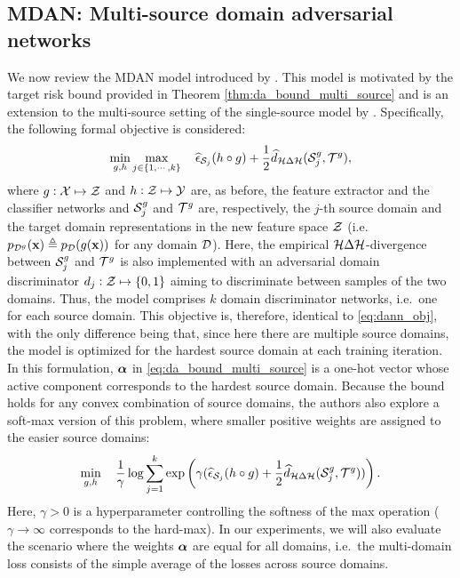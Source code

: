 \subsection{MDAN: Multi-source domain adversarial networks}
\label{sec:da_sensors_mdan}
We now review the MDAN model introduced by \citet{Zhao2018}. This model is motivated by the target risk bound provided in Theorem \ref{thm:da_bound_multi_source} and is an extension to the multi-source setting of the single-source model by \citet{Ganin2015}. Specifically, the following formal objective is considered:
\begin{equation}
    \min_{g,h} \max_{j \in \{1,\cdots,k\}} \quad \widehat{\epsilon}_{{\mathcal{S}}_j}(h \circ g) + \frac{1}{2} \widehat{d}_{{\mathcal{H}} \Delta {\mathcal{H}}}({\mathcal{S}}^g_j, {\mathcal{T}}^g),
\end{equation}
where $g: {\mathcal{X}} \mapsto {\mathcal{Z}}$ and $h: {\mathcal{Z}} \mapsto {\mathcal{Y}}$ are, as before, the feature extractor and the classifier networks and ${\mathcal{S}}^g_j$ and ${\mathcal{T}}^g$ are, respectively, the $j$-th source domain and the target domain representations in the new feature space ${\mathcal{Z}}$ (i.e.\ $p_{{\mathcal{D}}^g}({\mathbf{x}}) \triangleq p_{\mathcal{D}}(g({\mathbf{x}}))$ for any domain ${\mathcal{D}}$). Here, the empirical ${\mathcal{H}} \Delta {\mathcal{H}}$-divergence between ${\mathcal{S}}^g_j$ and ${\mathcal{T}}^g$ is also implemented with an adversarial domain discriminator $d_j:{\mathcal{Z}} \mapsto \{0,1\}$ aiming to discriminate between samples of the two domains. Thus, the model comprises $k$ domain discriminator networks, i.e.\ one for each source domain. This objective is, therefore, identical to \eqref{eq:dann_obj}, with the only difference being that, since here there are multiple source domains, the model is optimized for the hardest source domain at each training iteration. In this formulation, ${\bm{\alpha}}$ in \eqref{eq:da_bound_multi_source} is a one-hot vector whose active component corresponds to the hardest source domain. Because the bound holds for any convex combination of source domains, the authors also explore a soft-max version of this problem, where smaller positive weights are assigned to the easier source domains:
\begin{equation}
    \min_{g,h} \quad \frac{1}{\gamma} \log \sum_{j=1}^{k} \exp \left( \gamma( \widehat{\epsilon}_{{\mathcal{S}}_j}(h \circ g) + \frac{1}{2} \widehat{d}_{{\mathcal{H}} \Delta {\mathcal{H}}}({\mathcal{S}}^g_j, {\mathcal{T}}^g)) \right).
\end{equation}
Here, $\gamma > 0$ is a hyperparameter controlling the softness of the max operation ($\gamma \to \infty$ corresponds to the hard-max). In our experiments, we will also evaluate the scenario where the weights ${\bm{\alpha}}$ are equal for all domains, i.e.\ the multi-domain loss consists of the simple average of the losses across source domains.

